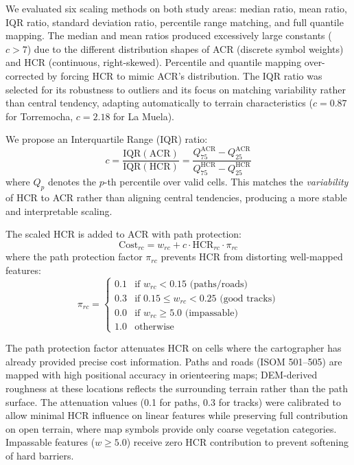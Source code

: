 \documentclass[11pt,a4paper]{article}
\begin{document}
We evaluated six scaling methods on both study areas: median ratio, mean ratio, IQR ratio, standard deviation ratio, percentile range matching, and full quantile mapping.
The median and mean ratios produced excessively large constants ($c > 7$) due to the different distribution shapes of ACR (discrete symbol weights) and HCR (continuous, right-skewed).
Percentile and quantile mapping over-corrected by forcing HCR to mimic ACR's distribution.
The IQR ratio was selected for its robustness to outliers and its focus on matching variability rather than central tendency, adapting automatically to terrain characteristics ($c = 0.87$ for Torremocha, $c = 2.18$ for La Muela).

We propose an Interquartile Range (IQR) ratio:
\begin{equation}
  c = \frac{\text{IQR}(\text{ACR})}{\text{IQR}(\text{HCR})} = \frac{Q_{75}^{\text{ACR}} - Q_{25}^{\text{ACR}}}{Q_{75}^{\text{HCR}} - Q_{25}^{\text{HCR}}}
  \label{eq:iqr}
\end{equation}
where $Q_p$ denotes the $p$-th percentile over valid cells.
This matches the \emph{variability} of HCR to ACR rather than aligning central tendencies, producing a more stable and interpretable scaling.

The scaled HCR is added to ACR with path protection:
\begin{equation}
  \text{Cost}_{rc} = w_{rc} + c \cdot \text{HCR}_{rc} \cdot \pi_{rc}
  \label{eq:combined}
\end{equation}
where the path protection factor $\pi_{rc}$ prevents HCR from distorting well-mapped features:
\begin{equation}
  \pi_{rc} = \begin{cases}
    0.1 & \text{if } w_{rc} < 0.15 \text{ (paths/roads)} \\
    0.3 & \text{if } 0.15 \leq w_{rc} < 0.25 \text{ (good tracks)} \\
    0.0 & \text{if } w_{rc} \geq 5.0 \text{ (impassable)} \\
    1.0 & \text{otherwise}
  \end{cases}
  \label{eq:pathprot}
\end{equation}

The path protection factor attenuates HCR on cells where the cartographer has already provided precise cost information.
Paths and roads (ISOM 501--505) are mapped with high positional accuracy in orienteering maps; DEM-derived roughness at these locations reflects the surrounding terrain rather than the path surface.
The attenuation values (0.1 for paths, 0.3 for tracks) were calibrated to allow minimal HCR influence on linear features while preserving full contribution on open terrain, where map symbols provide only coarse vegetation categories.
Impassable features ($w \geq 5.0$) receive zero HCR contribution to prevent softening of hard barriers.
\end{document}
